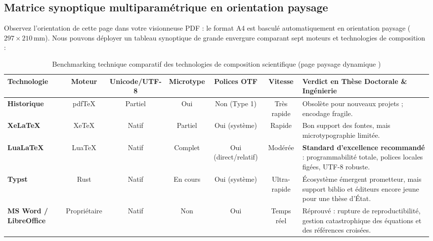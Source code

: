 \begin{landscape}
\activerStyleFocus

\subsection{Matrice synoptique multiparamétrique en orientation paysage}
Observez l'orientation de cette page dans votre visionneuse PDF :
le format A4 est basculé automatiquement en orientation paysage ($297 \times 210$\,mm).
Nous pouvons déployer un tableau synoptique de grande envergure comparant sept moteurs et technologies de composition :

\begin{table}[htbp]
  \centering
  \small
  \caption[Benchmarking technique comparatif des moteurs de composition scientifique]{Benchmarking technique comparatif des technologies de composition scientifique (page paysage dynamique )}
  \label{tab:benchmark-paysage}
  \begin{tabularx}{\linewidth}{l c c c c c >{\raggedright\arraybackslash}X}
    \toprule
    \textbf{Technologie} & \textbf{Moteur} & \textbf{Unicode/UTF-8} & \textbf{Microtype} & \textbf{Polices OTF} & \textbf{Vitesse} & \textbf{Verdict en Thèse Doctorale \& Ingénierie} \\
    \midrule
    \textbf{\LaTeXe{} Historique} & pdf\TeX{} & Partiel & Oui & Non (Type 1) & Très rapide & Obsolète pour nouveaux projets ; encodage fragile. \\
    \addlinespace
    \textbf{Xe\LaTeX{}} & Xe\TeX{} & Natif & Partiel & Oui (système) & Rapide & Bon support des fontes, mais microtypographie limitée. \\
    \addlinespace
    \textbf{Lua\LaTeX{}} & Lua\TeX{} & Natif & Complet & Oui (direct/relatif) & Modérée & \textbf{Standard d'excellence recommandé} : programmabilité totale, polices locales figées, UTF-8 robuste. \\
    \addlinespace
    \textbf{Typst} & Rust & Natif & En cours & Oui (système) & Ultra-rapide & Écosystème émergent prometteur, mais support biblio et éditeurs encore jeune pour une thèse d'État. \\
    \addlinespace
    \textbf{MS Word / LibreOffice} & Propriétaire & Natif & Non & Oui & Temps réel & Réprouvé : rupture de reproductibilité, gestion catastrophique des équations et des références croisées. \\
    \bottomrule
  \end{tabularx}
\end{table}


\end{landscape}
